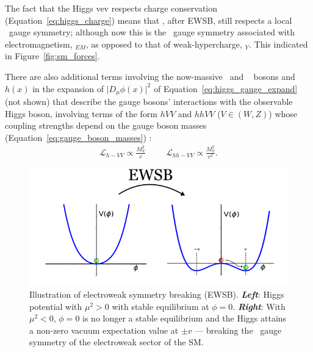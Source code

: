 The fact that the Higgs vev respects charge conservation (Equation~\ref{eq:higgs_charge}) means
that \SML, after EWSB, still respects a local \Uone~gauge symmetry; although now
this is the \Uone~gauge symmetry associated with electromagnetism, \Uone$_{EM}$,
as opposed to that of weak-hypercharge, \Uone$_Y$. This indicated in Figure~\ref{fig:sm_forces}.

There are also additional terms involving the now-massive \fieldWpm~and \fieldZ~ bosons and $h(x)$ in the expansion of $\lvert D_{\mu}\phi(x)\rvert^2$ of
Equation~\ref{eq:higgs_gauge_expand} (not shown) that describe the gauge bosons' interactions with the observable Higgs boson,
involving terms of the form $hVV$ and $hhVV$ ($V\in(W,Z)$) whose coupling strengths depend
on the gauge boson masses (Equation~\ref{eq:gauge_boson_masses}) {\color{red}{feynman diagrams?}}:
\begin{align}
	\mathcal{L}_{h-VV} \propto \frac{M_V^2}{v} \hspace{1cm} \mathcal{L}_{hh-VV} \propto \frac{M_V^2}{v^2}.
	\label{eq:higgs_gauge_couplings}
\end{align}
\begin{figure}[!htb]
	\begin{center}
		\includegraphics[width=\textwidth]{figures/chapter1/higgs_potential_trans}
		\caption{Illustration of electroweak symmetry breaking (EWSB).
			\textbf{\textit{Left}}: Higgs potential with $\mu^2>0$ with stable equilibrium at $\phi=0$.
			\textbf{\textit{Right}}: With $\mu^2<0$, $\phi=0$ is no longer
			a stable equilibrium and the Higgs attains a non-zero vacuum
			expectation value at $\pm v$ --- breaking the \SUewk~gauge symmetry of the electroweak
			sector of the SM.
		}
	\label{fig:higgs_ewsb}
	\end{center}
\end{figure}

